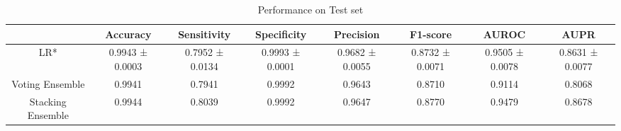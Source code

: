 \begin{table}[h!]
    \centering
    \caption{Performance on Test set}
    \begin{adjustbox}{width=\textwidth}
    \begin{tabular}{|c|c|c|c|c|c|c|c|}
    \hline
      & Accuracy & Sensitivity & Specificity & Precision & F1-score & AUROC & AUPR \\
    \hline
    LR* & 0.9943 ± 0.0003 & 0.7952 ± 0.0134 & 0.9993 ± 0.0001 & 0.9682 ± 0.0055 & 0.8732 ± 0.0071 & 0.9505 ± 0.0078 & 0.8631 ± 0.0077 \\
    \hline
    Voting Ensemble & 0.9941 & 0.7941 & 0.9992 & 0.9643 & 0.8710 & 0.9114 & 0.8068 \\
    \hline
    Stacking Ensemble & 0.9944 & 0.8039 & 0.9992 & 0.9647 & 0.8770 & 0.9479 & 0.8678 \\
    \hline
    \end{tabular}
    \end{adjustbox}
    \end{table}
    